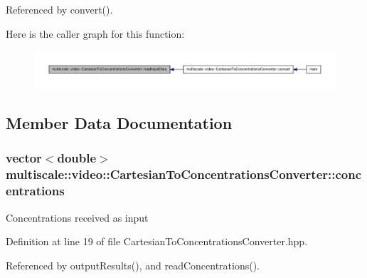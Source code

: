 \-Referenced by convert().



\-Here is the caller graph for this function\-:\nopagebreak
\begin{figure}[H]
\begin{center}
\leavevmode
\includegraphics[width=350pt]{classmultiscale_1_1video_1_1CartesianToConcentrationsConverter_a94094cdeaf0f48164911188709dc0e2f_icgraph}
\end{center}
\end{figure}




\subsection{\-Member \-Data \-Documentation}
\hypertarget{classmultiscale_1_1video_1_1CartesianToConcentrationsConverter_a335f54163cbabeaa80c1da811b9f9c0c}{
\subsubsection[{concentrations}]{\setlength{\rightskip}{0pt plus 5cm}vector$<$double$>$ {\bf multiscale\-::video\-::\-Cartesian\-To\-Concentrations\-Converter\-::concentrations}}}\label{classmultiscale_1_1video_1_1CartesianToConcentrationsConverter_a335f54163cbabeaa80c1da811b9f9c0c}
\-Concentrations received as input 

\-Definition at line 19 of file \-Cartesian\-To\-Concentrations\-Converter.\-hpp.



\-Referenced by output\-Results(), and read\-Concentrations().

